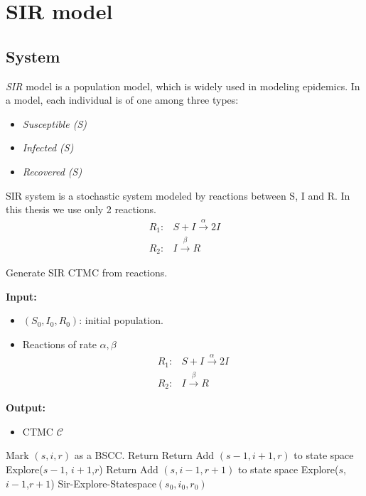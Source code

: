 \section{SIR model}
\subsection{System}
\textit{SIR} model  is a population model, which is widely used in modeling epidemics. In a
 model, each individual is of one among three types:
\begin{itemize}
    \item \textit{Susceptible (S)}
    \item \textit{Infected (S)}
    \item \textit{Recovered (S)}
\end{itemize}
SIR system is a stochastic system modeled by reactions between S, I and R. In this thesis we use
only 2 reactions.
\begin{align*}
    R_1: & S + I \xrightarrow{\alpha} 2I \\
    R_2: & I     \xrightarrow{\beta} R
\end{align*}

\begin{algorithm}[H]
    \caption{Generate SIR CTMC from reactions.}
    \label{alg:gen-sir-ctmc}
    \hspace*{\algorithmicindent} \textbf{Input:}
    \begin{itemize}
        \item $(S_0, I_0, R_0)$: initial population.
        \item Reactions of rate $\alpha,\beta$
              \begin{align*}
                  R_1: & S + I \xrightarrow{\alpha} 2I \\
                  R_2: & I     \xrightarrow{\beta} R
              \end{align*}
    \end{itemize}
    \hspace*{\algorithmicindent} \textbf{Output:}
    \begin{itemize}
        \item CTMC $\mathcal{C}$
    \end{itemize}
    \begin{algorithmic}[1]
        \State Mark $(s,i,r)$ as a BSCC.
        \State Return
        \EndIf
        \State Return
        \EndIf
        \State Add $(s-1, i+1, r)$ to state space
        \State Explore($s-1$, $i+1$,$r$)
        \EndIf
        \State Return
        \EndIf
        \State Add $(s, i-1, r+1)$ to state space
        \State Explore($s$, $i-1$,$r+1$)
        \EndIf
        \EndProcedure
        \State Sir-Explore-Statespace$(s_0,i_0,r_0)$
        \EndProcedure
    \end{algorithmic}
\end{algorithm}


